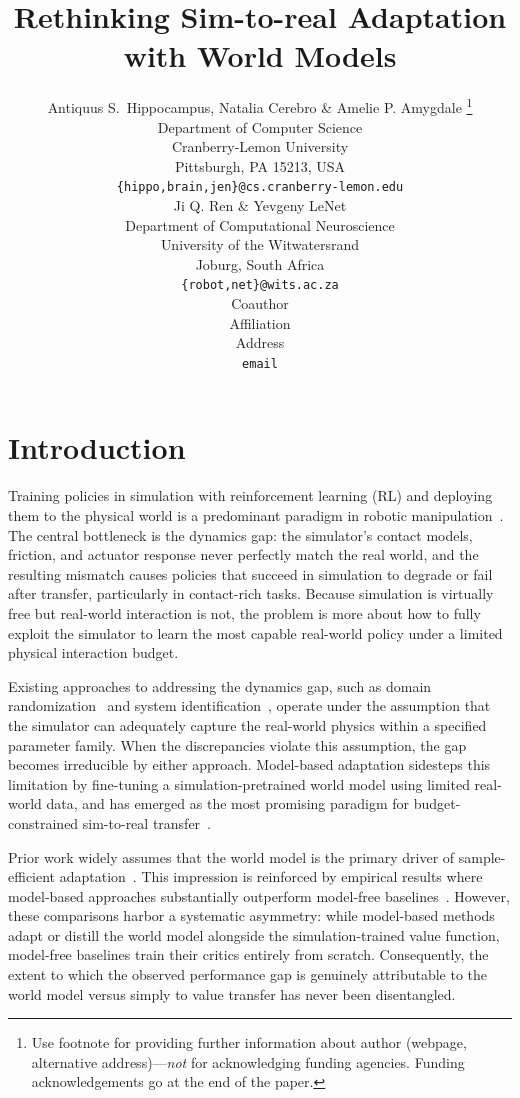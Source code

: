 \documentclass{article} %
\title{Rethinking Sim-to-real Adaptation with World Models}
\author{Antiquus S.~Hippocampus, Natalia Cerebro \& Amelie P. Amygdale \thanks{ Use footnote for providing further information
about author (webpage, alternative address)---\emph{not} for acknowledging
funding agencies.  Funding acknowledgements go at the end of the paper.} \\
Department of Computer Science\\
Cranberry-Lemon University\\
Pittsburgh, PA 15213, USA \\
\texttt{\{hippo,brain,jen\}@cs.cranberry-lemon.edu} \\
\And
Ji Q. Ren \& Yevgeny LeNet \\
Department of Computational Neuroscience \\
University of the Witwatersrand \\
Joburg, South Africa \\
\texttt{\{robot,net\}@wits.ac.za} \\
\AND
Coauthor \\
Affiliation \\
Address \\
\texttt{email}
}
\begin{document}
\maketitle

\begin{abstract}

\end{abstract}

\section{Introduction}
\label{intro}

Training policies in simulation with reinforcement learning (RL) and deploying them to the physical world is a predominant paradigm in robotic manipulation~\citep{andrychowicz2020learning, akkaya2019solving}. The central bottleneck is the dynamics gap: the simulator's contact models, friction, and actuator response never perfectly match the real world, and the resulting mismatch causes policies that succeed in simulation to degrade or fail after transfer, particularly in contact-rich tasks. Because simulation is virtually free but real-world interaction is not, the problem is more about how to fully exploit the simulator to learn the most capable real-world policy under a limited physical interaction budget.

Existing approaches to addressing the dynamics gap, such as domain randomization~\citep{tobin2017domain, peng2018sim} and system identification~\citep{ramos2019bayessim, memmel2024asid}, operate under the assumption that the simulator can adequately capture the real-world physics within a specified parameter family. When the discrepancies violate this assumption, the gap becomes irreducible by either approach. Model-based adaptation sidesteps this limitation by fine-tuning a simulation-pretrained world model using limited real-world data, and has emerged as the most promising paradigm for budget-constrained sim-to-real transfer~\citep{levy2026simulation}.

Prior work widely assumes that the world model is the primary driver of sample-efficient adaptation~\citep{yang2026rise}. This impression is reinforced by empirical results where model-based approaches substantially outperform model-free baselines~\citep{yin2025rapidly, levy2026simulation}. However, these comparisons harbor a systematic asymmetry: while model-based methods adapt or distill the world model alongside the simulation-trained value function, model-free baselines train their critics entirely from scratch. Consequently, the extent to which the observed performance gap is genuinely attributable to the world model versus simply to value transfer has never been disentangled.
\end{document}
